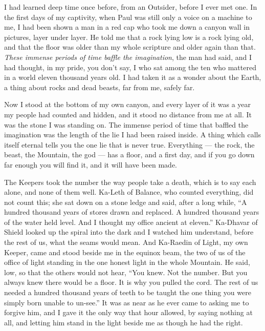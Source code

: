\ornament

I had learned deep time once before, from an Outsider, before I ever met one. In the first days of my captivity, when Paul was still only a voice on a machine to me, I had been shown a man in a red cap who took me down a canyon wall in pictures, layer under layer. He told me that a rock lying low is a rock lying old, and that the floor was older than my whole scripture and older again than that. \emph{These immense periods of time baffle the imagination}, the man had said, and I had thought, in my pride, you don't say, I who sat among the ten who mattered in a world eleven thousand years old. I had taken it as a wonder about the Earth, a thing about rocks and dead beasts, far from me, safely far.\par

Now I stood at the bottom of my own canyon, and every layer of it was a year my people had counted and hidden, and it stood no distance from me at all. It was the stone I was standing on. The immense period of time that baffled the imagination was the length of the lie I had been raised inside. A thing which calls itself eternal tells you the one lie that is never true. Everything --- the rock, the beast, the Mountain, the god --- has a floor, and a first day, and if you go down far enough you will find it, and it will have been made.\par

The Keepers took the number the way people take a death, which is to say each alone, and none of them well. Ka-Leth of Balance, who counted everything, did not count this; she sat down on a stone ledge and said, after a long while, ``A hundred thousand years of stores drawn and replaced. A hundred thousand years of the water held level. And I thought my office ancient at eleven.'' Ka-Dhavar of Shield looked up the spiral into the dark and I watched him understand, before the rest of us, what the seams would mean. And Ka-Raedin of Light, my own Keeper, came and stood beside me in the equinox beam, the two of us of the office of light standing in the one honest light in the whole Mountain. He said, low, so that the others would not hear, ``You knew. Not the number. But you always knew there would be a floor. It is why you pulled the cord. The rest of us needed a hundred thousand years of teeth to be taught the one thing you were simply born unable to un-see.'' It was as near as he ever came to asking me to forgive him, and I gave it the only way that hour allowed, by saying nothing at all, and letting him stand in the light beside me as though he had the right.\par

